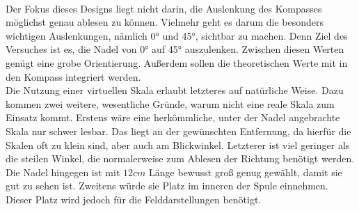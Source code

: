 \vspace{8px}
\begin{center}
	\\
\end{center}
\vspace{6px}

Der Fokus dieses Designs liegt nicht darin, die Auslenkung des Kompasses möglichst genau ablesen zu können. Vielmehr geht es darum die besonders wichtigen Auslenkungen, nämlich 0° und 45°, sichtbar zu machen. Denn Ziel des Versuches ist es, die Nadel von 0° auf 45° auszulenken. Zwischen diesen Werten genügt eine grobe Orientierung. Außerdem sollen die theoretischen Werte mit in den Kompass integriert werden.\\

Die Nutzung einer virtuellen Skala erlaubt letzteres auf natürliche Weise. Dazu kommen zwei weitere, wesentliche Gründe, warum nicht eine reale Skala zum Einsatz kommt. Erstens wäre eine herkömmliche, unter der Nadel angebrachte Skala nur schwer lesbar. Das liegt an der gewünschten Entfernung, da hierfür die Skalen oft zu klein sind, aber auch am Blickwinkel. Letzterer ist viel geringer als die steilen Winkel, die normalerweise zum Ablesen der Richtung benötigt werden. Die Nadel hingegen ist mit $12 cm$ Länge bewusst groß genug gewählt, damit sie gut zu sehen ist. Zweitens würde sie Platz im inneren der Spule einnehmen. Dieser Platz wird jedoch für die Felddarstellungen benötigt.\\

